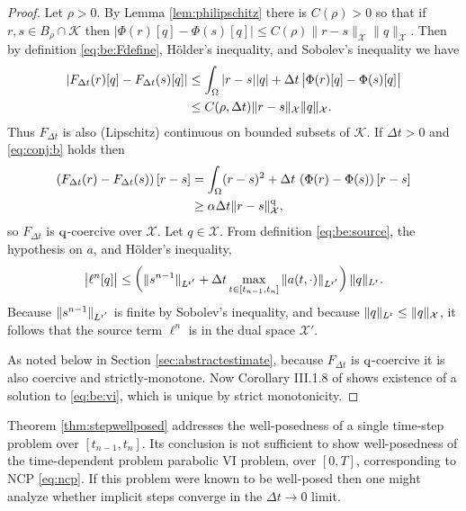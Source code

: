 \documentclass[hidelinks,onefignum,onetabnum,final]{siamart220329}  %
\newcommand{\cK}{\mathcal{K}}
\newcommand{\cX}{\mathcal{X}}
\newcommand{\qq}{{\text{\textnormal{q}}}}
\newcommand{\rr}{{\text{\textnormal{r}}}}
\begin{document}
\begin{proof}  Let $\rho>0$.  By Lemma \ref{lem:philipschitz} there is $C(\rho)>0$ so that if $r,s\in B_\rho\cap\cK$ then $\big|\Phi(r)[q] - \Phi(s)[q]\big| \le C(\rho) \|r-s\|_{\cX} \|q\|_{\cX}$.  Then by definition \eqref{eq:be:Fdefine}, H\"older's inequality, and Sobolev's inequality we have
\begin{align}
\left|F_{\Delta t}(r)[q] - F_{\Delta t}(s)[q]\right| &\le \int_\Omega |r-s||q| + \Delta t\, \big|\Phi(r)[q] - \Phi(s)[q]\big| \\
    &\le C(\rho,\Delta t) \|r-s\|_{\cX} \|q\|_\cX. \notag
\end{align}
Thus $F_{\Delta t}$ is also (Lipschitz) continuous on bounded subsets of $\cK$.  If $\Delta t>0$ and \eqref{eq:conj:b} holds then
\begin{align}
\left(F_{\Delta t}(r) - F_{\Delta t}(s)\right)[r-s] &= \int_\Omega (r-s)^2 + \Delta t\, \left(\Phi(r) - \Phi(s)\right)[r-s] \\
    &\ge \alpha\Delta t \|r-s\|_{\cX}^\qq, \notag
\end{align}
so $F_{\Delta t}$ is $\qq$-coercive over $\cX$.  Let $q\in\cX$.  From definition \eqref{eq:be:source}, the hypothesis on $a$, and H\"older's inequality,
\begin{equation}
\big|\ell^n[q]\big| \le \left(\|s^{n-1}\|_{L^{\rr'}} + \Delta t \max_{t\in[t_{n-1},t_n]} \|a(t,\cdot)\|_{L^{\rr'}}\right) \|q\|_{L^\rr}.
\label{eq:sourcetermbound}
\end{equation}
Because $\|s^{n-1}\|_{L^{\rr'}}$ is finite by Sobolev's inequality, and because $\|q\|_{L^\rr} \le \|q\|_{\cX}$, it follows that the source term $\ell^n$ is in the dual space $\cX'$.

As noted below in Section \ref{sec:abstractestimate}, because $F_{\Delta t}$ is $\qq$-coercive it is also coercive and strictly-monotone.  Now Corollary III.1.8 of \cite{KinderlehrerStampacchia1980} shows existence of a solution to \eqref{eq:be:vi}, which is unique by strict monotonicity.
\end{proof}

Theorem \ref{thm:stepwellposed} addresses the well-posedness of a single time-step problem over $[t_{n-1},t_n]$.  Its conclusion is not sufficient to show well-posedness of the time-dependent problem parabolic VI problem, over $[0,T]$, corresponding to NCP \eqref{eq:ncp}.  If this problem were known to be well-posed then one might analyze whether implicit steps converge in the $\Delta t\to 0$ limit.
\end{document}
